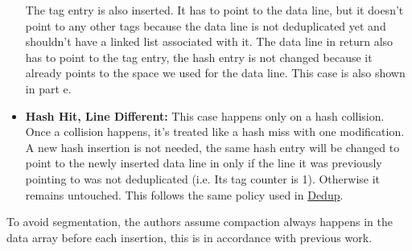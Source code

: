 \begin{itemize}
        The tag entry is also inserted. It has to point to the data line, but it doesn't point to any other tags because the data line is not deduplicated yet and shouldn't have a linked list associated with it. The data line in return also has to point to the tag entry, the hash entry is not changed because it already points to the space we used for the data line. This case is also shown in part e.
    \item \textbf{Hash Hit, Line Different:} This case happens only on a hash collision. Once a collision happens, it's treated like a hash miss with one modification. A new hash insertion is not needed, the same hash entry will be changed to point to the newly inserted data line in only if the line it was previously pointing to was not deduplicated (i.e. Its tag counter is 1). Otherwise it remains untouched. This follows the same policy used in \hyperref[ssec:DedupOperations]{Dedup}.
\end{itemize}
To avoid segmentation, the authors assume compaction always happens in the data array before each insertion, this is in accordance with previous work.
